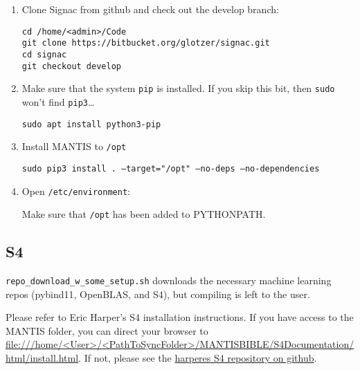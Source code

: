 \begin{enumerate}
\item Clone Signac from github and check out the develop branch:

	\texttt{cd /home/<admin>/Code} \\
	\texttt{git clone https://bitbucket.org/glotzer/signac.git} \\
	\texttt{cd signac} \\
	\texttt{git checkout develop}

\item Make sure that the system \texttt{pip} is installed. If you skip this bit, then \texttt{sudo} won't find \texttt{pip3}\dots

	\texttt{sudo apt install python3-pip}

\item Install MANTIS to \texttt{/opt}

\texttt{sudo pip3 install . --target="/opt" --no-deps --no-dependencies}

\item Open \texttt{/etc/environment}:
	
	Make sure that \texttt{/opt} has been added to PYTHONPATH.
\end{enumerate}

\subsection{S4} \label{subsec:S4compiling}

\texttt{repo\_download\_w\_some\_setup.sh} downloads the necessary machine learning repos (pybind11, OpenBLAS, and S4), but compiling is left to the user.

Please refer to Eric Harper's S4 installation instructions. If you have access to the MANTIS folder, you can direct your browser to \url{file:///home/<User>/<PathToSyncFolder>/MANTISBIBLE/S4Documentation/html/install.html}. If not, please see the \href{https://github.com/harperes/S4}{harperes S4 repository on github}.
